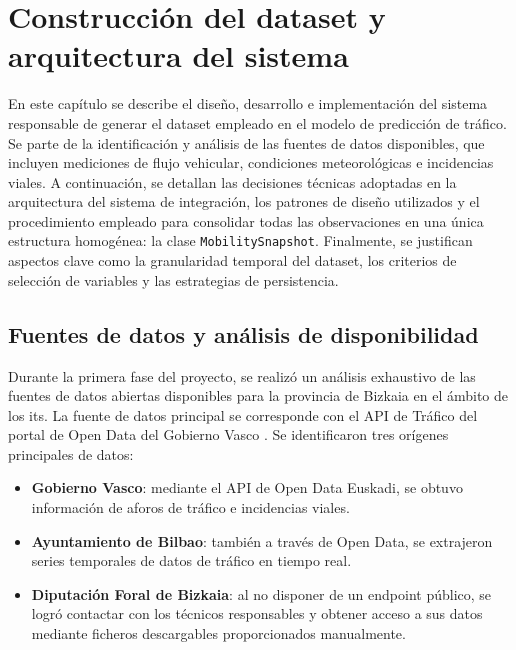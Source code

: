 \section*{Construcción del dataset y arquitectura del sistema}
\label{sec:dataset_arquitectura}

%
%

En este capítulo se describe el diseño, desarrollo e implementación del sistema responsable de generar el dataset empleado en el modelo de predicción de tráfico. Se parte de la identificación y análisis de las fuentes de datos disponibles, que incluyen mediciones de flujo vehicular, condiciones meteorológicas e incidencias viales. A continuación, se detallan las decisiones técnicas adoptadas en la arquitectura del sistema de integración, los patrones de diseño utilizados y el procedimiento empleado para consolidar todas las observaciones en una única estructura homogénea: la clase \texttt{MobilitySnapshot}. Finalmente, se justifican aspectos clave como la granularidad temporal del dataset, los criterios de selección de variables y las estrategias de persistencia.


\subsection{Fuentes de datos y análisis de disponibilidad}

Durante la primera fase del proyecto, se realizó un análisis exhaustivo de las fuentes de datos abiertas disponibles para la provincia de Bizkaia en el ámbito de los \acrshort{its}. La fuente de datos principal se corresponde con el API de Tráfico del portal de Open Data del Gobierno Vasco \cite{apiTraffic}. Se identificaron tres orígenes principales de datos:

\begin{itemize}
	\item \textbf{Gobierno Vasco}: mediante el API de Open Data Euskadi, se obtuvo información de aforos de tráfico e incidencias viales.
	\item \textbf{Ayuntamiento de Bilbao}: también a través de Open Data, se extrajeron series temporales de datos de tráfico en tiempo real.
	\item \textbf{Diputación Foral de Bizkaia}: al no disponer de un endpoint público, se logró contactar con los técnicos responsables y obtener acceso a sus datos mediante ficheros descargables proporcionados manualmente.
\end{itemize}

